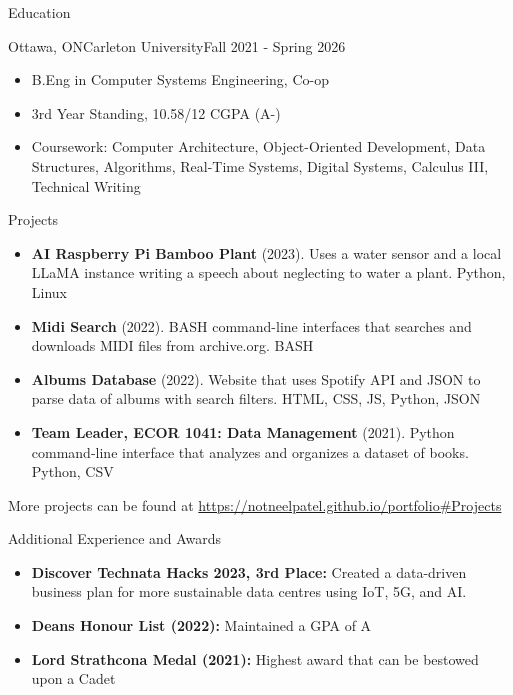 \documentclass[]{mcdowellcv}
\begin{document}
	\begin{cvsection}{Education}
		\begin{cvsubsection}{Ottawa, ON}{Carleton University}{Fall 2021 - Spring 2026}
			\begin{itemize}
				\item B.Eng in Computer Systems Engineering, Co-op
				\item 3rd Year Standing, 10.58/12 CGPA (A-)
				\item Coursework: Computer Architecture, Object-Oriented Development, Data Structures, Algorithms, Real-Time Systems, Digital Systems, Calculus III, Technical Writing
			\end{itemize}
		\end{cvsubsection}
	\end{cvsection}
	
	\begin{cvsection}{Projects}
		\begin{cvsubsection}{}{}{}
			\begin{itemize}
				\item \textbf{AI Raspberry Pi Bamboo Plant} (2023). Uses a water sensor and a local LLaMA instance writing a speech about neglecting to water a plant. Python, Linux
				\item \textbf{Midi Search} (2022). BASH command-line interfaces that searches and downloads MIDI files from archive.org. BASH
				\item \textbf{Albums Database} (2022). Website that uses Spotify API and JSON to parse data of albums with search filters. HTML, CSS, JS, Python, JSON
				\item \textbf{Team Leader, ECOR 1041: Data Management} (2021). Python command-line interface that analyzes and organizes a dataset of books. Python, CSV
			\end{itemize}
			
				More projects can be found at \url{https://notneelpatel.github.io/portfolio#Projects}
		\end{cvsubsection}
	\end{cvsection}
	
	\begin{cvsection}{Additional Experience and Awards}
		\begin{cvsubsection}{}{}{}	
			\begin{itemize}
				\item \textbf{Discover Technata Hacks 2023, 3rd Place:} Created a data-driven business plan for more sustainable data centres using IoT, 5G, and AI.  
				\item \textbf {Deans Honour List (2022):} Maintained a GPA of A
				\item \textbf{Lord Strathcona Medal (2021):} Highest award that can be bestowed upon a Cadet
			\end{itemize}
		\end{cvsubsection}
	\end{cvsection}
	
\end{document}
